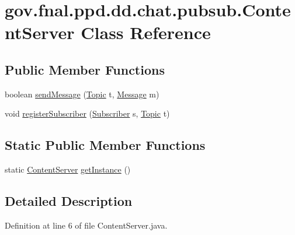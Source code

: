 \hypertarget{classgov_1_1fnal_1_1ppd_1_1dd_1_1chat_1_1pubsub_1_1ContentServer}{\section{gov.\-fnal.\-ppd.\-dd.\-chat.\-pubsub.\-Content\-Server Class Reference}
\label{classgov_1_1fnal_1_1ppd_1_1dd_1_1chat_1_1pubsub_1_1ContentServer}
}
\subsection*{Public Member Functions}
\begin{DoxyCompactItemize}
\item 
boolean \hyperlink{classgov_1_1fnal_1_1ppd_1_1dd_1_1chat_1_1pubsub_1_1ContentServer_a586be72627f00c91c177c04994d2ab5f}{send\-Message} (\hyperlink{classgov_1_1fnal_1_1ppd_1_1dd_1_1chat_1_1pubsub_1_1Topic}{Topic} t, \hyperlink{classgov_1_1fnal_1_1ppd_1_1dd_1_1chat_1_1pubsub_1_1Message}{Message} m)
\item 
void \hyperlink{classgov_1_1fnal_1_1ppd_1_1dd_1_1chat_1_1pubsub_1_1ContentServer_a03c07aa18988a7f08f86af1ecbed22a1}{register\-Subscriber} (\hyperlink{classgov_1_1fnal_1_1ppd_1_1dd_1_1chat_1_1pubsub_1_1Subscriber}{Subscriber} s, \hyperlink{classgov_1_1fnal_1_1ppd_1_1dd_1_1chat_1_1pubsub_1_1Topic}{Topic} t)
\end{DoxyCompactItemize}
\subsection*{Static Public Member Functions}
\begin{DoxyCompactItemize}
\item 
static \hyperlink{classgov_1_1fnal_1_1ppd_1_1dd_1_1chat_1_1pubsub_1_1ContentServer}{Content\-Server} \hyperlink{classgov_1_1fnal_1_1ppd_1_1dd_1_1chat_1_1pubsub_1_1ContentServer_aa8c105050aed9de99b247a3ef6751382}{get\-Instance} ()
\end{DoxyCompactItemize}


\subsection{Detailed Description}


Definition at line 6 of file Content\-Server.\-java.



